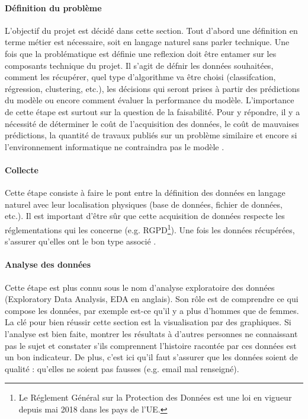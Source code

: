 \documentclass[10pt, french, a4paper]{report}
\begin{document}
\paragraph{Définition du problème}
L'objectif du projet est décidé dans cette section. Tout d'abord une définition en terme métier est nécessaire, soit en langage naturel sans parler technique. Une fois que la problématique est définie une reflexion doit être entamer sur les composants technique du projet. Il s'agit de défnir les données souhaitées, comment les récupérer, quel type d'algorithme va être choisi (classifcation, régression, clustering, etc.), les décisions qui seront prises à partir des prédictions du modèle ou encore comment évaluer la performance du modèle. L'importance de cette étape est surtout sur la question de la faisabilité. Pour y répondre, il y a nécessité de déterminer le coût de l'acquisition des données, le coût de mauvaises prédictions, la quantité de travaux publiés sur un problème similaire et encore si l'environnement informatique ne contraindra pas le modèle \citep{jordan_organizing_2018}.

\paragraph{Collecte}
Cette étape consiste à faire le pont entre la définition des données en langage naturel avec leur localisation physiques (base de données, fichier de données, etc.). Il est important d'être sûr que cette acquisition de données respecte les réglementations qui les concerne (e.g. RGPD\footnote{Le Réglement Général sur la Protection des Données est une loi en vigueur depuis mai 2018 dans les pays de l'UE.}). Une fois les données récupérées, s'assurer qu'elles ont le bon type associé \citep{mayo_machine_2018}.

\paragraph{Analyse des données}
Cette étape est plus connu sous le nom d'analyse exploratoire des données (Exploratory Data Analysis, EDA en anglais). Son rôle est de comprendre ce qui compose les données, par exemple est-ce qu'il y a plus d'hommes que de femmes. La clé pour bien réussir cette section est la visualisation par des graphiques. Si l'analyse est bien faite, montrer les résultats à d'autres personnes ne connaissant pas le sujet et constater s'ils comprennent l'histoire racontée par ces données est un bon indicateur. De plus, c'est ici qu'il faut s'assurer que les données soient de qualité : qu'elles ne soient pas fausses (e.g. email mal renseigné).
\end{document}
